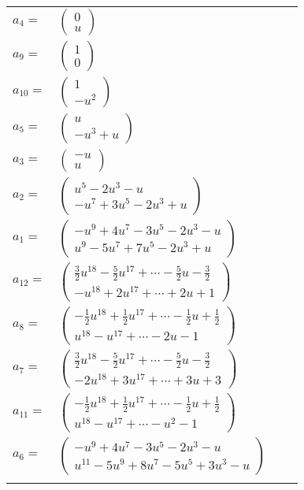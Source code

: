 \documentclass[1p]{elsarticle_modified}
\theoremstyle{definition}
\begin{document}
\begin{tabular}{m{7pt} m{180pt} m{7pt} m{180pt} }
\flushright $a_{4}=$&$\begin{pmatrix}0\\u\end{pmatrix}$ \\
\flushright $a_{9}=$&$\begin{pmatrix}1\\0\end{pmatrix}$ \\
\flushright $a_{10}=$&$\begin{pmatrix}1\\- u^2\end{pmatrix}$ \\
\flushright $a_{5}=$&$\begin{pmatrix}u\\- u^3+u\end{pmatrix}$ \\
\flushright $a_{3}=$&$\begin{pmatrix}- u\\u\end{pmatrix}$ \\
\flushright $a_{2}=$&$\begin{pmatrix}u^5-2 u^3- u\\- u^7+3 u^5-2 u^3+u\end{pmatrix}$ \\
\flushright $a_{1}=$&$\begin{pmatrix}- u^9+4 u^7-3 u^5-2 u^3- u\\u^9-5 u^7+7 u^5-2 u^3+u\end{pmatrix}$ \\
\flushright $a_{12}=$&$\begin{pmatrix}\frac{3}{2} u^{18}-\frac{5}{2} u^{17}+\cdots-\frac{5}{2} u-\frac{3}{2}\\- u^{18}+2 u^{17}+\cdots+2 u+1\end{pmatrix}$ \\
\flushright $a_{8}=$&$\begin{pmatrix}-\frac{1}{2} u^{18}+\frac{1}{2} u^{17}+\cdots-\frac{1}{2} u+\frac{1}{2}\\u^{18}- u^{17}+\cdots-2 u-1\end{pmatrix}$ \\
\flushright $a_{7}=$&$\begin{pmatrix}\frac{3}{2} u^{18}-\frac{5}{2} u^{17}+\cdots-\frac{5}{2} u-\frac{3}{2}\\-2 u^{18}+3 u^{17}+\cdots+3 u+3\end{pmatrix}$ \\
\flushright $a_{11}=$&$\begin{pmatrix}-\frac{1}{2} u^{18}+\frac{1}{2} u^{17}+\cdots-\frac{1}{2} u+\frac{1}{2}\\u^{18}- u^{17}+\cdots- u^2-1\end{pmatrix}$ \\
\flushright $a_{6}=$&$\begin{pmatrix}- u^9+4 u^7-3 u^5-2 u^3- u\\u^{11}-5 u^9+8 u^7-5 u^5+3 u^3- u\end{pmatrix}$\\&\end{tabular}
\end{document}
